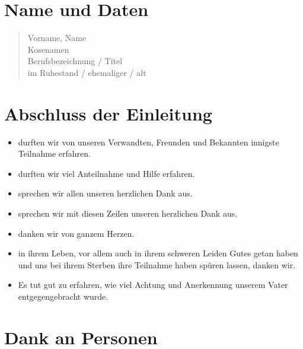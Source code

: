 \documentclass[ngerman,a4paper,11pt]{scrreprt}
\begin{document}
\section{Name und Daten}
\label{sec-2-1-4}

\begin{verse}
Vorname, Name \\
Kosenamen \\
Berufsbezeichnung / Titel \\
im Ruhestand / ehemaliger / alt \\
\end{verse}

\section{Abschluss der Einleitung}
\label{sec-2-1-5}

\begin{itemize}
\item durften wir von unseren Verwandten, Freunden und Bekannten innigste
Teilnahme erfahren.
\item durften wir viel Anteilnahme und Hilfe erfahren.
\item sprechen wir allen unseren herzlichen Dank aus.
\item sprechen wir mit diesen Zeilen unseren herzlichen Dank aus.
\item danken wir von ganzem Herzen.
\item in ihrem Leben, vor allem auch in ihrem schweren Leiden Gutes getan haben
und uns bei ihrem Sterben ihre Teilnahme haben spüren lassen, danken wir.
\item Es tut gut zu erfahren, wie viel Achtung und Anerkennung unserem Vater
entgegengebracht wurde.
\end{itemize}

\section{Dank an Personen}
\label{sec-2-1-6}
\end{document}
